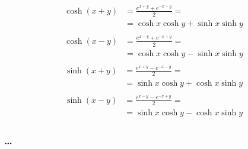 \documentclass[letterpaper,10pt,italian]{jupyterBook}
\begin{document}
\begin{equation*}
\begin{split}\begin{aligned}
  \cosh(x+y) & = \frac{e^{x+y} + e^{-x-y}}{2} = \\
   & = \cosh x \cosh y + \sinh x \sinh y
\end{aligned}\end{split}
\end{equation*}\begin{equation*}
\begin{split}\begin{aligned}
  \cosh(x-y) & = \frac{e^{x-y} + e^{-x+y}}{2} = \\
   & = \cosh x \cosh y - \sinh x \sinh y
\end{aligned}\end{split}
\end{equation*}\begin{equation*}
\begin{split}\begin{aligned}
  \sinh(x+y) & = \frac{e^{x+y} - e^{-x-y}}{2} = \\
   & = \sinh x \cosh y + \cosh x \sinh y
\end{aligned}\end{split}
\end{equation*}\begin{equation*}
\begin{split}\begin{aligned}
  \sinh(x-y) & = \frac{e^{x-y} - e^{-x+y}}{2} = \\
   & = \sinh x \cosh y - \cosh x \sinh y
\end{aligned}\end{split}
\end{equation*}\subsubsection*{…}

\sphinxstepscope
\end{document}

